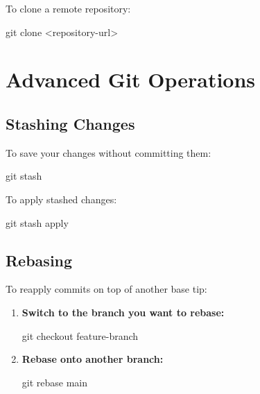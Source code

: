 \documentclass[
  letterpaper,
  DIV=11,
  numbers=noendperiod]{scrreprt}
\newenvironment{Shaded}{\begin{snugshade}}{\end{snugshade}}
\newcommand{\FunctionTok}[1]{\textcolor[rgb]{0.28,0.35,0.67}{#1}}
\newcommand{\NormalTok}[1]{\textcolor[rgb]{0.00,0.23,0.31}{#1}}
\newcommand{\OperatorTok}[1]{\textcolor[rgb]{0.37,0.37,0.37}{#1}}
\begin{document}
To clone a remote repository:

\begin{Shaded}
\begin{Highlighting}[]
\FunctionTok{git}\NormalTok{ clone }\OperatorTok{\textless{}}\NormalTok{repository{-}url}\OperatorTok{\textgreater{}}
\end{Highlighting}
\end{Shaded}

\section{Advanced Git Operations}\label{advanced-git-operations}

\subsection{Stashing Changes}\label{stashing-changes}

To save your changes without committing them:

\begin{Shaded}
\begin{Highlighting}[]
\FunctionTok{git}\NormalTok{ stash}
\end{Highlighting}
\end{Shaded}

To apply stashed changes:

\begin{Shaded}
\begin{Highlighting}[]
\FunctionTok{git}\NormalTok{ stash apply}
\end{Highlighting}
\end{Shaded}

\subsection{Rebasing}\label{rebasing}

To reapply commits on top of another base tip:

\begin{enumerate}
\def\labelenumi{\arabic{enumi}.}
\item
  \textbf{Switch to the branch you want to rebase:}

\begin{Shaded}
\begin{Highlighting}[]
\FunctionTok{git}\NormalTok{ checkout feature{-}branch}
\end{Highlighting}
\end{Shaded}
\item
  \textbf{Rebase onto another branch:}

\begin{Shaded}
\begin{Highlighting}[]
\FunctionTok{git}\NormalTok{ rebase main}
\end{Highlighting}
\end{Shaded}
\end{enumerate}
\end{document}
